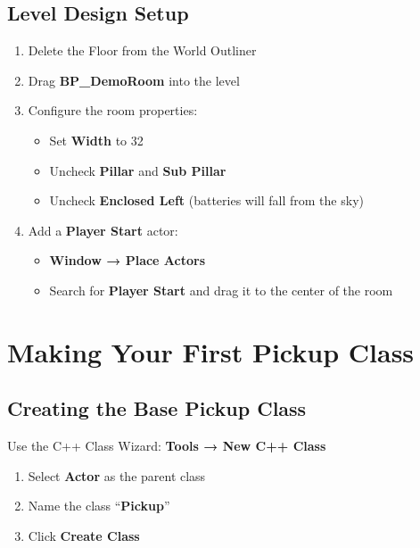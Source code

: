 \documentclass[
  letterpaper,
  DIV=11,
  numbers=noendperiod]{scrartcl}
\providecommand{\tightlist}{%
  \setlength{\itemsep}{0pt}\setlength{\parskip}{0pt}}
\begin{document}
\subsection{Level Design Setup}\label{level-design-setup}

\begin{enumerate}
\def\labelenumi{\arabic{enumi}.}
\tightlist
\item
  Delete the Floor from the World Outliner
\item
  Drag \textbf{BP\_DemoRoom} into the level
\item
  Configure the room properties:

  \begin{itemize}
  \tightlist
  \item
    Set \textbf{Width} to 32
  \item
    Uncheck \textbf{Pillar} and \textbf{Sub Pillar}
  \item
    Uncheck \textbf{Enclosed Left} (batteries will fall from the sky)
  \end{itemize}
\item
  Add a \textbf{Player Start} actor:

  \begin{itemize}
  \tightlist
  \item
    \textbf{Window → Place Actors}
  \item
    Search for \textbf{Player Start} and drag it to the center of the
    room
  \end{itemize}
\end{enumerate}

\section{Making Your First Pickup
Class}\label{making-your-first-pickup-class}

\subsection{Creating the Base Pickup
Class}\label{creating-the-base-pickup-class}

Use the C++ Class Wizard: \textbf{Tools → New C++ Class}

\begin{enumerate}
\def\labelenumi{\arabic{enumi}.}
\tightlist
\item
  Select \textbf{Actor} as the parent class
\item
  Name the class ``\textbf{Pickup}''
\item
  Click \textbf{Create Class}
\end{enumerate}
\end{document}
